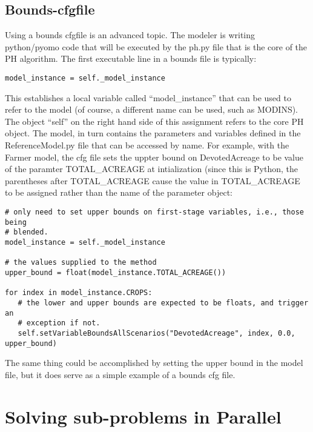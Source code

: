 \subsection{Bounds-cfgfile}

Using a bounds cfgfile is an advanced topic. The modeler is writing python/pyomo
code that will be executed by the ph.py file that is the core of the PH
algorithm. The first executable line in a bounds file is typically:

\begin{verbatim}
model_instance = self._model_instance
\end{verbatim}

This establishes a local variable called ``model\_instance'' that can be used to
refer to the model (of course, a different name can be used, such as MODINS).
The object ``self'' on the right hand side of this assignment refers to the core
PH object. The model, in turn contains the parameters and variables defined in
the ReferenceModel.py file that can be accessed by name. For example, with the
Farmer model, the cfg file sets the uppter bound on DevotedAcreage to be value
of the paramter TOTAL\_ACREAGE at intialization (since this is Python, the
parentheses after TOTAL\_ACREAGE cause the value in TOTAL\_ACREAGE to be
assigned rather than the name of the parameter object:

\begin{verbatim}
# only need to set upper bounds on first-stage variables, i.e., those being
# blended.
model_instance = self._model_instance

# the values supplied to the method
upper_bound = float(model_instance.TOTAL_ACREAGE())

for index in model_instance.CROPS:
   # the lower and upper bounds are expected to be floats, and trigger an
   # exception if not.
   self.setVariableBoundsAllScenarios("DevotedAcreage", index, 0.0, upper_bound)
\end{verbatim}

The same thing could be accomplished by setting the upper bound in the model
file, but it does serve as a simple example of a bounds cfg file.



\section{Solving sub-problems in Parallel \label{parallelsec}}

